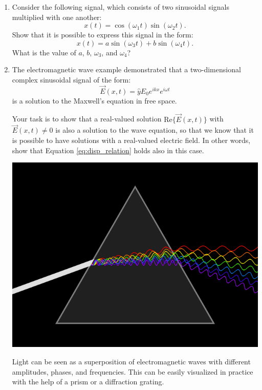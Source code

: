 \begin{enumerate}
  \item Consider the following signal, which consists of two sinusoidal signals multiplied with one another:
        \begin{equation}
          x(t) = \cos(\omega_1 t)\sin(\omega_2 t).
        \end{equation}
        Show that it is possible to express this signal in the form:
        \begin{equation}
          x(t) = a \sin (\omega_3 t) + b \sin(\omega_4 t).
        \end{equation}
        What is the value of $a$, $b$, $\omega_3$, and $\omega_4$?

  \item The electromagnetic wave example demonstrated that a two-dimensional complex sinusoidal signal of the form:
        \begin{equation}
          \vec{E}(x,t) = \hat{y}E_0 e^{i k x} e^{i \omega t}
        \end{equation}
        is a solution to the Maxwell's equation in free space.

        Your task is to show that a real-valued solution $\mathrm{Re}\{\vec{E}(x,t)\}$ with $\vec{E}(x,t)\ne 0$ 
        is also a solution to the wave equation, so that we know that it is possible to have solutions 
        with a real-valued electric field. In other words, show that Equation \ref{eq:disp_relation} 
        holds also in this case.
        \begin{marginfigure}[0cm]
          \begin{center}
            \includegraphics[width=\textwidth]{ch06/figures/prism.png}
          \end{center}
          \caption{Light can be seen as a superposition of electromagnetic waves with different 
          amplitudes, phases, and frequencies. This can be easily visualized in practice with the 
          help of a prism or a diffraction grating.}
          \label{fig:prism_ex}
        \end{marginfigure}


\end{enumerate}
